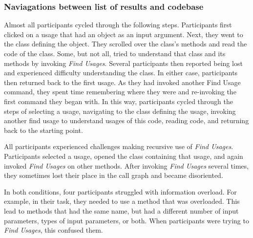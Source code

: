 \documentclass[conference]{IEEEtran}
\begin{document}
\subsubsection{Naviagations between list of results and codebase}Almost all participants cycled through the following steps.
Participants first clicked on a usage that had an object as an input argument. Next, they went to the class defining the object. They scrolled over the class's methods and read the code of the class. Some, but not all, tried to understand that class and its methods by invoking \textit{Find Usages}. Several participants then reported being lost and experienced difficulty understanding the class. In either case, participants then returned back to the first usage. As they had invoked another Find Usage command, they spent time remembering where they were and re-invoking the first command they began with. In this way, participants cycled through the steps of 
selecting a usage, navigating to the class defining the usage, invoking another find usage to understand usages of this code, reading code, and returning back to the starting point. \par

All participants experienced challenges making recursive use of \textit{Find Usages}. Participants selected a usage, opened the class containing that usage, and again invoked \textit{Find Usages} on other methods. After invoking \textit{Find Usages} several times, they sometimes lost their place in the call graph and became disoriented. \par

In both conditions, four participants struggled with information overload. For example, in their task, they needed to use a method that was overloaded. This lead to methods that had the same name, but had a different number of input parameters, types of input parameters, or both. When participants were trying to \textit{Find Usages}, this confused them.\par
\end{document}
